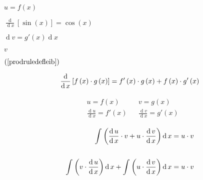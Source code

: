 \documentclass{report}
\def\lthtmlcheckvsize{\ifdim\ht\sizebox<\vsize 
  \ifdim\wd\sizebox<\hsize\expandafter\hfill\fi \expandafter\vfill
  \else\expandafter\vss\fi}%
\begin{document}
{\newpage\clearpage
{}%
$u= f\left( x \right)$%
\lthtmlindisplaymathZ
\lthtmlcheckvsize\clearpage}

{\newpage\clearpage
{}%
$\frac{\operatorname{d} }{\operatorname{d} x}\left[ \sin{\left( x \right)} \right]= \cos{\left( x \right)}$%
\lthtmlindisplaymathZ
\lthtmlcheckvsize\clearpage}

{\newpage\clearpage
{}%
$\operatorname{d} v= g'\left( x \right) \operatorname{d} x$%
\lthtmlindisplaymathZ
\lthtmlcheckvsize\clearpage}

{\newpage\clearpage
{}%
$v$%
\lthtmlindisplaymathZ
\lthtmlcheckvsize\clearpage}

{\newpage\clearpage
{}%

$\left( \ref{prodruledefleib} \right)$%
\lthtmlindisplaymathZ
\lthtmlcheckvsize\clearpage}

{\newpage\clearpage
{}%
\begin{align}
\frac{\operatorname{d} }{\operatorname{d} x}\left[ f\left( x \right)\cdot g\left( x \right) \right]&= f'\left( x \right)\cdot g\left( x \right)+ f\left( x \right)\cdot g'\left( x \right)\notag \\
 \end{align}%
\lthtmlfigureZ
\lthtmlcheckvsize\clearpage}

{\newpage\clearpage
{}%
\begin{align}
\begin{matrix}
  &u = f\left( x \right) &&v = g\left( x \right)\\
  &\frac{\operatorname{d}u }{\operatorname{d} x}= f'\left( x \right) && \frac{\operatorname{d}v }{\operatorname{d} x} = g'\left( x \right)
\end{matrix}
\end{align}%
\lthtmlfigureZ
\lthtmlcheckvsize\clearpage}

{\newpage\clearpage
{}%
\begin{align}
  \int^{}_{} \left( \frac{\operatorname{d}u }{\operatorname{d} x}\cdot v + u\cdot \frac{\operatorname{d}v }{\operatorname{d} x} \right)  \operatorname{d}x &= u\cdot v\notag \\
  \ \notag \\
\int^{}_{} \left( v\cdot \frac{\operatorname{d}u }{\operatorname{d} x} \right)  \operatorname{d}x +  \int^{}_{} \left( u\cdot \frac{\operatorname{d}v }{\operatorname{d} x} \right)  \operatorname{d}x&= u\cdot v  \notag 
\end{align}%
\lthtmlfigureZ
\lthtmlcheckvsize\clearpage}
\end{document}
